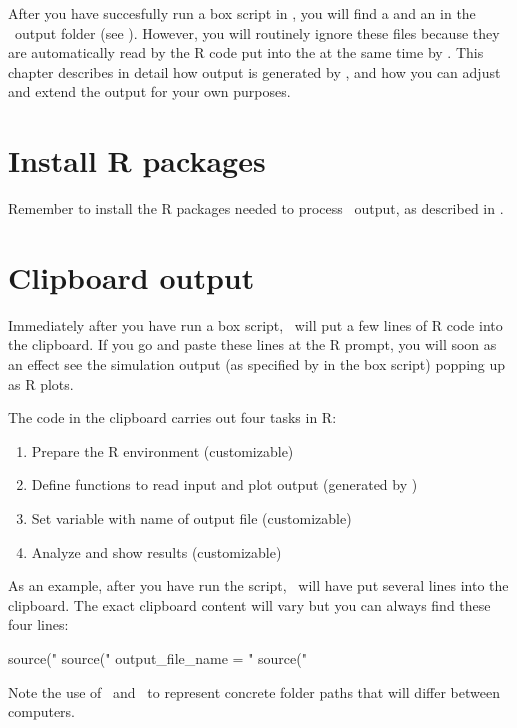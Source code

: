After you have succesfully run a box script in \US, you will find a  and an  in the \US\ output folder (see ). However, you will routinely ignore these files because they are automatically read by the R code put into the  at the same time by \US. This chapter describes in detail how output is generated by \US, and how you can adjust and extend the output for your own purposes.

\section{Install R packages}
Remember to install the R packages needed to process \US\ output, as described in .

\section{Clipboard output}
Immediately after you have run a box script, \US\ will put a few lines of R code into the clipboard. If you go and paste these lines at the R prompt, you will soon as an effect see the simulation output (as specified by  in the box script) popping up as R plots. 

The code in the clipboard carries out four tasks in R:
\begin{enumerate}
\item Prepare the R environment (customizable)
\item Define functions to read input and plot output (generated by \US)
\item Set variable with name of output file (customizable)
\item Analyze and show results (customizable)
\end{enumerate}

As an example, after you have run the  script, \US\ will have put several lines into the clipboard. The exact clipboard content will vary but you can always find these four lines:

\lstset{numbers=left}
\begin{rscript}
source("%
source("%
output_file_name = "%
source("%
\end{rscript}
\lstset{numbers=none}

Note the use of \ and \outputfolderexplained\ to represent concrete folder paths that will differ between computers.

